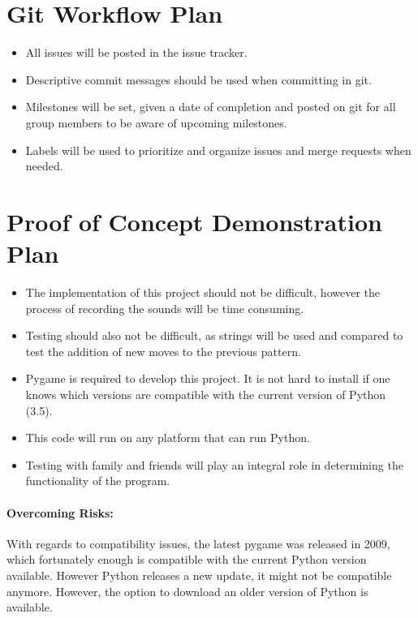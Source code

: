 \documentclass{article}
\begin{document}
\section{Git Workflow Plan}

\begin{itemize}
\item All issues will be posted in the issue tracker.
\item Descriptive commit messages should be used when committing in git. 
\item Milestones will be set, given a date of completion and posted on git for all group members to be aware of upcoming milestones.
\item Labels will be used to prioritize and organize issues and merge requests when needed.
\end{itemize}

\section{Proof of Concept Demonstration Plan}

\begin{itemize}
\item The implementation of this project should not be difficult, however the process of recording the sounds will be time consuming.
\item Testing should also not be difficult, as strings will be used and compared to test the addition of new moves to the previous pattern.
\item Pygame is required to develop this project. It is not hard to install if one knows which versions are compatible with the current version of Python (3.5).
\item This code will run on any platform that can run Python.
\item Testing with family and friends will play an integral role in determining the functionality of the program.
\end{itemize}

\paragraph{Overcoming Risks:}
With regards to compatibility issues, the latest pygame was released in 2009, which fortunately enough is compatible with the current Python version available. However Python releases a new update, it might not be compatible anymore. However, the option to download an older version of Python is available.
\end{document}
